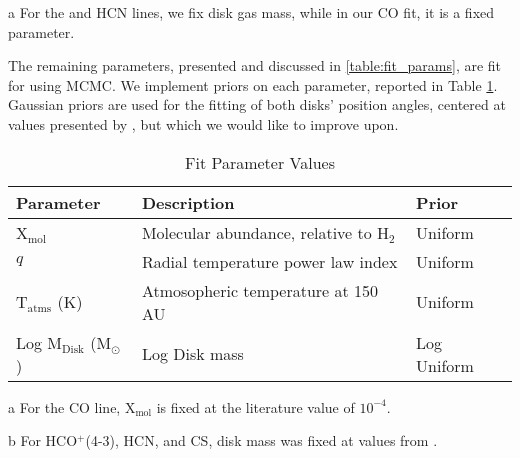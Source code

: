 \begin{table}
\begin{threeparttable}
    \begin{tablenotes}\footnotesize
      \item[a] For the \hco and HCN lines, we fix disk gas mass, while in our CO fit, it is a fixed parameter.
    \end{tablenotes}
  \end{threeparttable}
\end{table}


The remaining parameters, presented and discussed in \ref{table:fit_params}, are fit for using MCMC. We implement priors on each parameter, reported in Table \ref{table:fit_priors}. Gaussian priors are used for the fitting of both disks' position angles, centered at values presented by \cite{Williams2014}, but which we would like to improve upon.

\begin{table}
  \begin{threeparttable}
    \centering
    \caption{Fit Parameter Values}
    \label{table:fit_priors}
    \renewcommand{\arraystretch}{1.2}
    \begin{tabular}{l  l l }
      \toprule \toprule
      Parameter             &  Description                                     & Prior   \\
      \midrule %
      X$_\text{mol}$        &  Molecular abundance, relative to H$_2$\tnote{b} & Uniform \\
      $q$                   &  Radial temperature power law index              & Uniform \\
      T$_\text{atms}$ (K)   & Atmosopheric temperature at 150 AU               & Uniform \\
      Log M$_\text{Disk}$ (M$_\odot$) &  Log Disk mass\tnote{c}                    & Log Uniform \\
      \bottomrule
    \end{tabular}

    \begin{tablenotes}\footnotesize
      \item[a] For the CO line, X$_\text{mol}$ is fixed at the literature value of $10^{-4}$.
      \item[b] For HCO$^+$(4-3), HCN, and CS, disk mass was fixed at values from \cite{Williams2014}.
    \end{tablenotes}
  \end{threeparttable}
\end{table}


